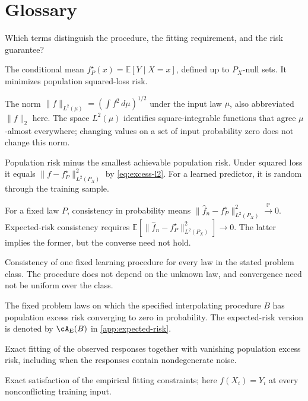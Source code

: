 \documentclass[11pt,twoside]{article}
\newcommand{\E}{\mathbb E}
\renewcommand{\P}{\mathbb P}
\theoremstyle{definition}
\theoremstyle{remark}
\begin{document}
\section*{Glossary}

Which terms distinguish the procedure, the fitting requirement, and the risk
guarantee?

\begin{description}[style=nextline,leftmargin=1.5em,labelindent=0pt]
\item[Regression function $f_P^\star$]
The conditional mean $f_P^\star(x)=\E[Y\mid X=x]$, defined up to
$P_X$-null sets. It minimizes population squared-loss risk.
\item[Population norm $\|f\|_{L^2(\mu)}$]
The norm $\|f\|_{L^2(\mu)}=(\int f^2\,d\mu)^{1/2}$ under the input law
$\mu$, also abbreviated $\|f\|_2$ here. The space $L^2(\mu)$ identifies
square-integrable functions that agree $\mu$-almost everywhere; changing
values on a set of input probability zero does not change this norm.
\item[Population excess risk]
Population risk minus the smallest achievable population risk. Under
squared loss it equals $\|f-f_P^\star\|_{L^2(P_X)}^2$ by
\cref{eq:excess-l2}. For a learned predictor, it is random through the
training sample.
\item[Consistency in probability and in expected risk]
For a fixed law $P$, consistency in probability means
$\|\widehat f_n-f_P^\star\|_{L^2(P_X)}^2\xrightarrow{\P}0$.
Expected-risk consistency requires
$\E[\|\widehat f_n-f_P^\star\|_{L^2(P_X)}^2]\to0$.
The latter implies the former, but the converse need not hold.
\item[Universal consistency]
Consistency of one fixed learning procedure for every law in the stated
problem class. The procedure does not depend on the unknown law, and
convergence need not be uniform over the class.
\item[Benign set $\cA(B)$]
The fixed problem laws on which the specified interpolating procedure $B$ has
population excess risk converging to zero in probability. The
expected-risk version is denoted by $\cA_{\rm E}(B)$ in
\cref{app:expected-risk}.
\item[Benign overfitting]
Exact fitting of the observed responses together with vanishing population
excess risk, including when the responses contain nondegenerate noise.
\item[Interpolation]
Exact satisfaction of the empirical fitting constraints; here
$f(X_i)=Y_i$ at every nonconflicting training input.

\end{description}
\end{document}
